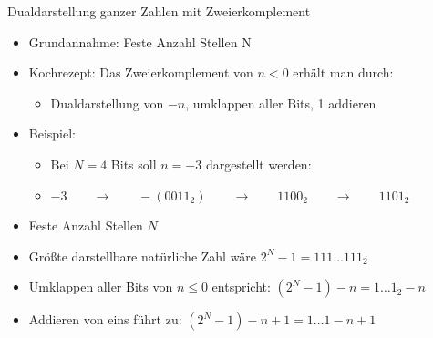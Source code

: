 \documentclass[12pt%
,aspectratio=169%
]{beamer}
\begin{document}
\begin{frame}{Dualdarstellung ganzer Zahlen mit Zweierkomplement}
\begin{itemize}
	\item Grundannahme: Feste Anzahl Stellen N
	\item Kochrezept: Das Zweierkomplement von $n < 0$ erhält man durch:
	\begin{itemize}
		\item Dualdarstellung von $-n$, umklappen aller Bits, 1 addieren
	\end{itemize}
	\item Beispiel:
	\begin{itemize}
		\item Bei $N = 4$ Bits soll $n = -3$ dargestellt werden:
		\item $-3 \qquad \to \qquad -(0011_2) \qquad \to \qquad 1100_2 \qquad \to \qquad 1101_2$
	\end{itemize}
\end{itemize}
\end{frame}

\begin{frame}
	\begin{itemize}
		\item Feste Anzahl Stellen $N$
		\item Größte darstellbare natürliche Zahl wäre $2^N - 1 = 111 \ldots 111_2$
		\item Umklappen aller Bits von $n \leq 0$ entspricht: $(2^N - 1) - n = 1 \ldots 1_2 - n$
		\item Addieren von eins führt zu: $(2^N - 1) - n + 1 = 1 \ldots 1 - n + 1$
	\end{itemize}
\end{frame}
\end{document}
